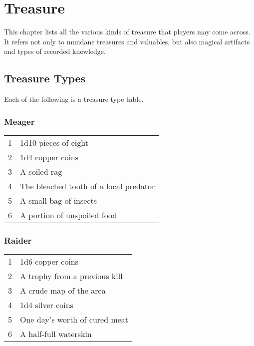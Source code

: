 \chapter{Treasure}

\begin{multicols}{2}

This chapter lists all the various kinds of treasure that
players may come across. It refers not only to mundane treasures
and valuables, but also magical artifacts and types of
recorded knowledge.

\section{Treasure Types}

Each of the following is a treasure type table.

\subsection{Meager}

\begin{center}
{
\begin{xtabular}{|l|l|}
1 & 1d10 pieces of eight \\
2 & 1d4 copper coins \\
3 & A soiled rag \\
4 & The bleached tooth of a local predator \\
5 & A small bag of insects \\
6 & A portion of unspoiled food \\
\hline
\end{xtabular}
}
\end{center}

\subsection{Raider}

\begin{center}
{
\begin{xtabular}{|l|l|}
1 & 1d6 copper coins \\
2 & A trophy from a previous kill \\
3 & A crude map of the area \\
4 & 1d4 silver coins \\
5 & One day's worth of cured meat \\
6 & A half-full waterskin \\
\hline
\end{xtabular}
}
\end{center}

\end{multicols}
